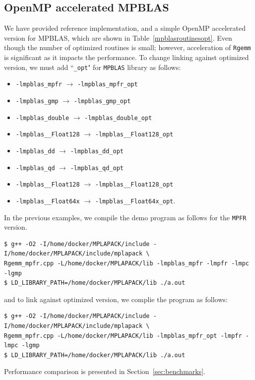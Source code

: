\documentclass[12pt]{article}
\begin{document}
\subsection{OpenMP accelerated MPBLAS}
We have provided reference implementation, and a simple OpenMP accelerated version for MPBLAS, which are shown in Table~\ref{mpblasroutinesopt}. Even though the number of optimized routines is small; however, acceleration of {\tt Rgemm} is significant as it impacts the performance.
To change linking against optimized version, we must add ``{\tt \_opt}" for {\tt MPBLAS} library as follows:
\begin{itemize}
    \item {\tt -lmpblas\_mpfr} $\rightarrow$ {\tt -lmpblas\_mpfr\_opt} 
    \item {\tt -lmpblas\_gmp} $\rightarrow$ {\tt -lmpblas\_gmp\_opt} 
    \item {\tt -lmpblas\_double} $\rightarrow$ {\tt -lmpblas\_double\_opt} 
    \item {\tt -lmpblas\_\_Float128} $\rightarrow$ {\tt -lmpblas\_\_Float128\_opt} 
    \item {\tt -lmpblas\_dd} $\rightarrow$ {\tt -lmpblas\_dd\_opt} 
    \item {\tt -lmpblas\_qd} $\rightarrow$ {\tt -lmpblas\_qd\_opt} 
    \item {\tt -lmpblas\_\_Float128} $\rightarrow$ {\tt -lmpblas\_\_Float128\_opt} 
    \item {\tt -lmpblas\_\_Float64x} $\rightarrow$ {\tt -lmpblas\_\_Float64x\_opt}.
\end{itemize}

In the previous examples, we compile the demo program as follows for the {\tt MPFR} version.
\begin{verbatim}
$ g++ -O2 -I/home/docker/MPLAPACK/include -I/home/docker/MPLAPACK/include/mplapack \
Rgemm_mpfr.cpp -L/home/docker/MPLAPACK/lib -lmpblas_mpfr -lmpfr -lmpc -lgmp
$ LD_LIBRARY_PATH=/home/docker/MPLAPACK/lib ./a.out
\end{verbatim}
and to link against optimized version, we complie the program as follows:
\begin{verbatim}
$ g++ -O2 -I/home/docker/MPLAPACK/include -I/home/docker/MPLAPACK/include/mplapack \
Rgemm_mpfr.cpp -L/home/docker/MPLAPACK/lib -lmpblas_mpfr_opt -lmpfr -lmpc -lgmp
$ LD_LIBRARY_PATH=/home/docker/MPLAPACK/lib ./a.out
\end{verbatim}

Performance comparison is presented in Section~\ref{sec:benchmarks}.
\end{document}
